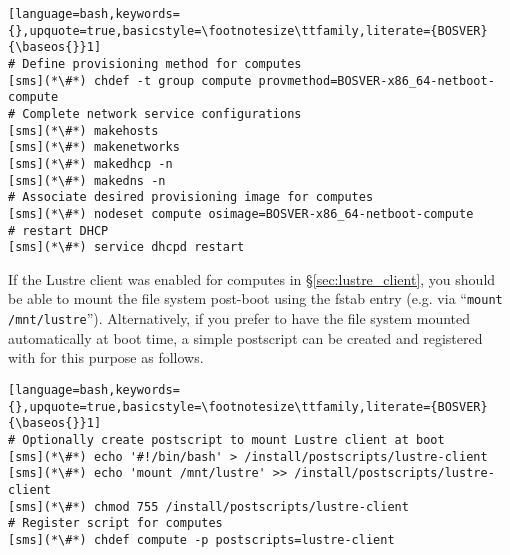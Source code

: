 \begin{lstlisting}[language=bash,keywords={},upquote=true,basicstyle=\footnotesize\ttfamily,literate={BOSVER}{\baseos{}}1]
# Define provisioning method for computes
[sms](*\#*) chdef -t group compute provmethod=BOSVER-x86_64-netboot-compute
# Complete network service configurations
[sms](*\#*) makehosts
[sms](*\#*) makenetworks
[sms](*\#*) makedhcp -n
[sms](*\#*) makedns -n
# Associate desired provisioning image for computes
[sms](*\#*) nodeset compute osimage=BOSVER-x86_64-netboot-compute
# restart DHCP
[sms](*\#*) service dhcpd restart
\end{lstlisting}

If the Lustre client was enabled for computes in \S\ref{sec:lustre_client}, you
should be able to mount the file system post-boot using the fstab entry
(e.g. via ``\texttt{mount /mnt/lustre}''). Alternatively, if 
you prefer to have the file system mounted automatically at boot time, a simple
postscript can be created and registered with \xCAT{} for this purpose as follows.

\begin{lstlisting}[language=bash,keywords={},upquote=true,basicstyle=\footnotesize\ttfamily,literate={BOSVER}{\baseos{}}1]
# Optionally create postscript to mount Lustre client at boot
[sms](*\#*) echo '#!/bin/bash' > /install/postscripts/lustre-client
[sms](*\#*) echo 'mount /mnt/lustre' >> /install/postscripts/lustre-client
[sms](*\#*) chmod 755 /install/postscripts/lustre-client
# Register script for computes
[sms](*\#*) chdef compute -p postscripts=lustre-client
\end{lstlisting}



